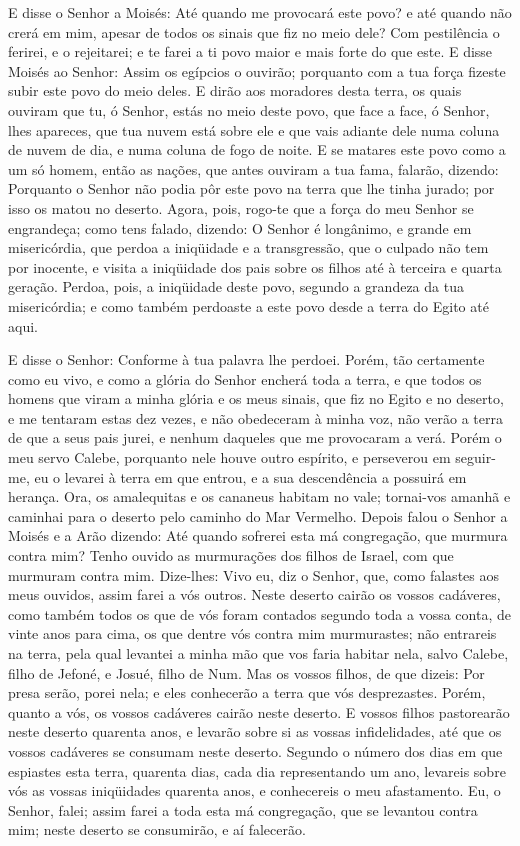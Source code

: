 E disse o Senhor a Moisés: Até quando me provocará este povo? e
até quando não crerá em mim, apesar de todos os sinais que fiz no
meio dele? Com pestilência o ferirei, e o rejeitarei; e te
farei a ti povo maior e mais forte do que este. E disse
Moisés ao Senhor: Assim os egípcios o ouvirão; porquanto com a tua
força fizeste subir este povo do meio deles. E dirão aos
moradores desta terra, os quais ouviram que tu, ó Senhor, estás no
meio deste povo, que face a face, ó Senhor, lhes apareces, que tua
nuvem está sobre ele e que vais adiante dele numa coluna de nuvem de
dia, e numa coluna de fogo de noite. E se matares este povo
como a um só homem, então as nações, que antes ouviram a tua fama,
falarão, dizendo: Porquanto o Senhor não podia pôr este povo
na terra que lhe tinha jurado; por isso os matou no deserto.
Agora, pois, rogo-te que a força do meu Senhor se engrandeça;
como tens falado, dizendo: O Senhor é longânimo, e grande em
misericórdia, que perdoa a iniqüidade e a transgressão, que o
culpado não tem por inocente, e visita a iniqüidade dos pais sobre
os filhos até à terceira e quarta geração. Perdoa, pois, a
iniqüidade deste povo, segundo a grandeza da tua misericórdia; e
como também perdoaste a este povo desde a terra do Egito até aqui.

E disse o Senhor: Conforme à tua palavra lhe perdoei.
Porém, tão certamente como eu vivo, e como a glória do Senhor
encherá toda a terra, e que todos os homens que viram a minha
glória e os meus sinais, que fiz no Egito e no deserto, e me
tentaram estas dez vezes, e não obedeceram à minha voz, não
verão a terra de que a seus pais jurei, e nenhum daqueles que me
provocaram a verá. Porém o meu servo Calebe, porquanto nele
houve outro espírito, e perseverou em seguir-me, eu o levarei à
terra em que entrou, e a sua descendência a possuirá em herança.
Ora, os amalequitas e os cananeus habitam no vale; tornai-vos
amanhã e caminhai para o deserto pelo caminho do Mar Vermelho.
Depois falou o Senhor a Moisés e a Arão dizendo: Até
quando sofrerei esta má congregação, que murmura contra mim? Tenho
ouvido as murmurações dos filhos de Israel, com que murmuram contra
mim. Dize-lhes: Vivo eu, diz o Senhor, que, como falastes aos
meus ouvidos, assim farei a vós outros. Neste deserto cairão
os vossos cadáveres, como também todos os que de vós foram contados
segundo toda a vossa conta, de vinte anos para cima, os que dentre
vós contra mim murmurastes; não entrareis na terra, pela qual
levantei a minha mão que vos faria habitar nela, salvo Calebe, filho
de Jefoné, e Josué, filho de Num. Mas os vossos filhos, de
que dizeis: Por presa serão, porei nela; e eles conhecerão a terra
que vós desprezastes. Porém, quanto a vós, os vossos
cadáveres cairão neste deserto. E vossos filhos pastorearão
neste deserto quarenta anos, e levarão sobre si as vossas
infidelidades, até que os vossos cadáveres se consumam neste
deserto. Segundo o número dos dias em que espiastes esta
terra, quarenta dias, cada dia representando um ano, levareis sobre
vós as vossas iniqüidades quarenta anos, e conhecereis o meu
afastamento. Eu, o Senhor, falei; assim farei a toda esta má
congregação, que se levantou contra mim; neste deserto se
consumirão, e aí falecerão.

